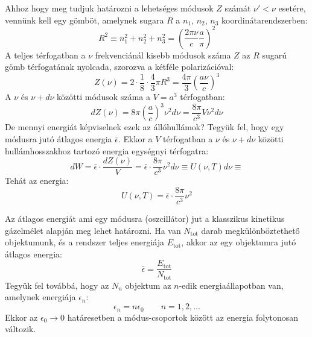 \documentclass[a4paper,12pt]{article}
\begin{document}
Ahhoz hogy meg tudjuk határozni a lehetséges módusok $Z$ számát $\nu' < \nu$ esetére, vennünk kell egy gömböt, amelynek sugara $R$ a $n_1$, $n_2$, $n_3$ koordinátarendszerben:
\begin{equation}
    R^2 \equiv n_1^2 + n_2^2 + n_3^2 = \left( \frac{2 \pi \nu}{c} \frac{a}{\pi} \right)^2
\end{equation}
A teljes térfogatban a $\nu$ frekvenciánál kisebb módusok száma $Z$ az $R$ sugarú gömb térfogatának nyolcada, szorozva a kétféle polarizációval:
\begin{equation}
    Z(\nu) = 2 \cdot \frac{1}{8} \cdot \frac{4}{3} \pi R^3 = \frac{4 \pi}{3} \left( \frac{a \nu}{c} \right)^3
\end{equation}
A $\nu$ és $\nu + d\nu$ közötti módusok száma a $ V = a^3$ térfogatban:
\begin{equation}
    dZ(\nu) = 8 \pi \left( \frac{a}{c} \right)^3 \nu^2 d\nu = \frac{8\pi}{c^3} V \nu^2 d\nu
\end{equation}
De mennyi energiát képviselnek ezek az állóhullámok? Tegyük fel, hogy egy módusra jutó átlagos energia $\bar{\epsilon}$. Ekkor a $V$ térfogatban a $\nu$ és $\nu + d\nu$ közötti hullámhosszakhoz tartozó energia egységnyi térfogatra:
\begin{equation}
    dW = \bar{\epsilon} \cdot \frac{dZ(\nu)}{V} = \bar{\epsilon} \cdot \frac{8\pi}{c^3} \nu^2 d\nu \equiv U(\nu, T) d\nu \equiv 
\end{equation}
Tehát az energia:
\begin{equation}
    U(\nu ,T) = \bar{\epsilon} \cdot \frac{8\pi}{c^3} \nu^2
\end{equation}

Az átlagos energiát ami egy módusra (oszcillátor) jut a klasszikus kinetikus gázelmélet alapján meg lehet határozni. Ha van $N_{\text{tot}}$ darab megkülönböztethető objektumunk, és a rendszer teljes energiája $E_{\text{tot}}$, akkor az egy objektumra jutó átlagos energia:
\begin{equation}
    \bar{\epsilon} = \frac{E_{\text{tot}}}{N_{\text{tot}}}
\end{equation}
Tegyük fel továbbá, hogy az $N_n$ objektum az $n$-edik energiaállapotban van, amelynek energiája $\epsilon_n$:
\begin{equation}
    \epsilon_n = n \epsilon_0 \qquad n = 1, 2, \ldots
\end{equation}
Ekkor az $\epsilon_0 \to 0$ határesetben a módus-csoportok között az energia folytonosan változik.
\end{document}
